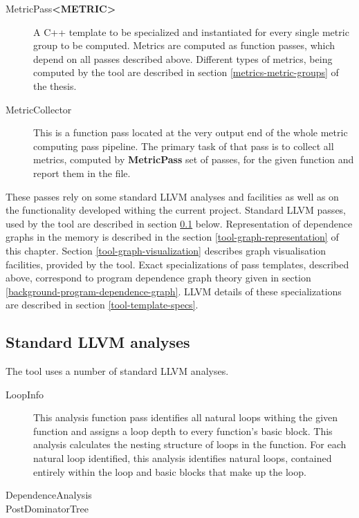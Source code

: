 \begin{description}
	\item [MetricPass\textbf{\textless METRIC\textgreater}] A C++ template to be specialized and instantiated for every single metric group to be computed. Metrics are computed as function passes, which depend on all passes described above. Different types of metrics, being computed by the tool are described in section \ref{metrics-metric-groups} of the thesis.
	
	\item [MetricCollector] This is a function pass located at the very output end of the whole metric computing pass pipeline. The primary task of that pass is to collect all metrics, computed by \textbf{MetricPass} set of passes, for the given function and report them in the file.     

\end{description} 

\quad These passes rely on some standard LLVM analyses and facilities as well as on the functionality developed withing the current project. Standard LLVM passes, used by the tool are described in section \ref{tool-standard-llvm-analyses} below. Representation of dependence graphs in the memory is described in the section \ref{tool-graph-representation} of this chapter. Section \ref{tool-graph-visualization} describes graph visualisation facilities, provided by the tool. Exact specializations of pass templates, described above, correspond to program dependence graph theory given in section \ref{background-program-dependence-graph}. LLVM details of these specializations are described in section \ref{tool-template-specs}.  

\subsection{Standard LLVM analyses} \label{tool-standard-llvm-analyses}
\qquad The tool uses a number of standard LLVM analyses.

\begin{description}
	
	\item [LoopInfo] This analysis function pass identifies all natural loops withing the given function and assigns a loop depth to every function's basic block. This analysis calculates the nesting structure of loops in the function. For each natural loop identified, this analysis identifies natural loops, contained entirely within the loop and basic blocks that make up the loop.   
	
	\item [DependenceAnalysis] 
	
	\item [PostDominatorTree]
	
\end{description} 

